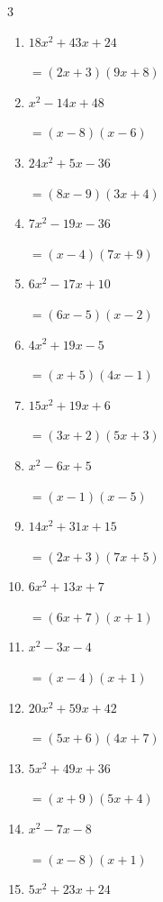 \begin{multicols}{3}
\begin{enumerate}
        $=(4x+7)(3x+2)$

\columnbreak %

\resetques

  \item $18x^{2}+43x+24$

        $=(2x+3)(9x+8)$

  \item $x^{2}-14x+48$

        $=(x-8)(x-6)$

  \item $24x^{2}+5x-36$

        $=(8x-9)(3x+4)$

  \item $7x^{2}-19x-36$

        $=(x-4)(7x+9)$

  \item $6x^{2}-17x+10$

        $=(6x-5)(x-2)$

  \item $4x^{2}+19x-5$

        $=(x+5)(4x-1)$

  \item $15x^{2}+19x+6$

        $=(3x+2)(5x+3)$

  \item $x^{2}-6x+5$

        $=(x-1)(x-5)$

  \item $14x^{2}+31x+15$

        $=(2x+3)(7x+5)$

  \item $6x^{2}+13x+7$

        $=(6x+7)(x+1)$

\columnbreak %

  \item $x^{2}-3x-4$

        $=(x-4)(x+1)$

  \item $20x^{2}+59x+42$

        $=(5x+6)(4x+7)$

  \item $5x^{2}+49x+36$

        $=(x+9)(5x+4)$

  \item $x^{2}-7x-8$

        $=(x-8)(x+1)$

  \item $5x^{2}+23x+24$


\end{enumerate}
\end{multicols}
